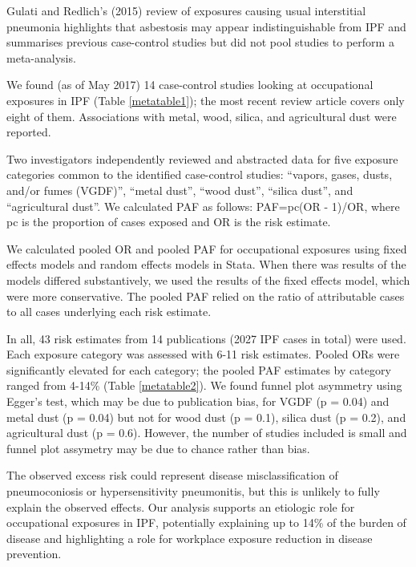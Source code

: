 \documentclass[a4paper,10pt]{article}
\begin{document}
Gulati and Redlich’s (2015) review of exposures causing usual interstitial pneumonia highlights that asbestosis may appear indistinguishable from IPF and summarises previous case-control studies but did not pool studies to perform a meta-analysis.\cite{Gulati2015}

We found (as of May 2017) 14 case-control studies looking at occupational exposures in IPF (Table \ref{metatable1}); the most recent review article covers only eight of them.  Associations with metal, wood, silica, and agricultural dust were reported. \cite{Scott1990, Iwai1994, Hubbard1996a, Mullen1998, Baumgartner2000, Miyake2005, Gustafson2007, Garcia-SanchoFigueroa2010, Garcia-Sancho2011, Awadalla2012, Paolocci2013, Koo2017}     

Two investigators independently reviewed and abstracted data for five exposure categories
common to the identified case-control studies: “vapors, gases, dusts, and/or fumes (VGDF)”, “metal dust”, “wood dust”, “silica dust”, and “agricultural dust”. We calculated PAF as follows: PAF=pc(OR - 1)/OR, where pc is the proportion of cases exposed and OR is the risk estimate.  

We calculated pooled OR and pooled PAF for occupational exposures using fixed effects models and  random effects models in Stata. When there was  results of the models differed substantively, we used the results of the fixed effects model, which were more conservative. The pooled PAF relied on the ratio of attributable cases to all cases underlying each risk estimate.

In all, 43 risk estimates from 14 publications (2027 IPF cases in total) were used. Each exposure category was assessed with 6-11 risk estimates. Pooled ORs were significantly elevated for each category; the pooled PAF estimates by category ranged from 4-14\% (Table \ref{metatable2}). We found funnel plot asymmetry using Egger's test, which may be due to publication bias, for VGDF (p = 0.04) and metal dust (p = 0.04) but not for wood dust (p = 0.1), silica dust (p = 0.2), and agricultural dust (p = 0.6). However, the number of studies included is small and funnel plot assymetry may be due to chance rather than bias.

The observed excess risk could represent disease misclassification of pneumoconiosis or hypersensitivity pneumonitis, but this is unlikely to fully explain the observed effects. Our analysis supports an etiologic role for occupational exposures in IPF, potentially explaining up to 14\% of the burden of disease and highlighting a role for workplace exposure reduction in disease prevention.
\end{document}
